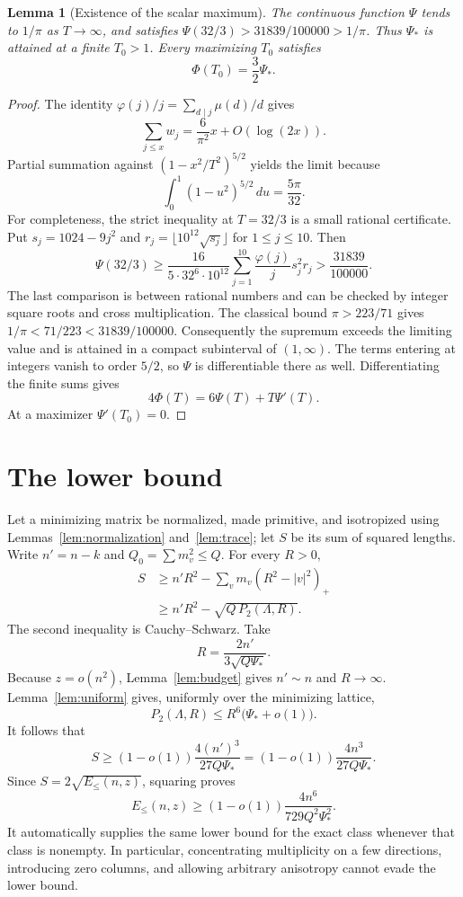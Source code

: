 \documentclass[11pt]{article}
\newtheorem{lemma}[theorem]{Lemma}
\theoremstyle{remark}\newtheorem{remark}[theorem]{Remark}
\begin{document}
\begin{lemma}[Existence of the scalar maximum]\label{lem:maximum}
The continuous function $\Psi$ tends to $1/\pi$ as $T\to\infty$, and satisfies $\Psi(32/3)>31839/100000>1/\pi$. Thus $\Psi_*$ is attained at a finite $T_0>1$. Every maximizing $T_0$ satisfies
\[
 \Phi(T_0)=\frac32\Psi_*.
\]
\end{lemma}
\begin{proof}
The identity $\varphi(j)/j=\sum_{d\mid j}\mu(d)/d$ gives
\[
 \sum_{j\le x}w_j=\frac6{\pi^2}x+O(\log(2x)).
\]
Partial summation against $(1-x^2/T^2)^{5/2}$ yields the limit because
\[
 \int_0^1(1-u^2)^{5/2}\,du=\frac{5\pi}{32}.
\]
For completeness, the strict inequality at $T=32/3$ is a small rational certificate. Put $s_j=1024-9j^2$ and $r_j=\lfloor10^{12}\sqrt{s_j}\rfloor$ for $1\le j\le10$. Then
\[
 \Psi(32/3)\ge\frac{16}{5\cdot32^6\cdot10^{12}}
 \sum_{j=1}^{10}\frac{\varphi(j)}{j}s_j^2r_j>\frac{31839}{100000}.
\]
The last comparison is between rational numbers and can be checked by integer square roots and cross multiplication. The classical bound $\pi>223/71$ gives $1/\pi<71/223<31839/100000$. Consequently the supremum exceeds the limiting value and is attained in a compact subinterval of $(1,\infty)$. The terms entering at integers vanish to order $5/2$, so $\Psi$ is differentiable there as well. Differentiating the finite sums gives
\[
 4\Phi(T)=6\Psi(T)+T\Psi'(T).
\]
At a maximizer $\Psi'(T_0)=0$.
\end{proof}

\section{The lower bound}
Let a minimizing matrix be normalized, made primitive, and isotropized using Lemmas~\ref{lem:normalization} and~\ref{lem:trace}; let $S$ be its sum of squared lengths. Write $n'=n-k$ and $Q_0=\sum m_v^2\le Q$. For every $R>0$,
\begin{align*}
 S&\ge n'R^2-\sum_v m_v(R^2-|v|^2)_+\\
  &\ge n'R^2-\sqrt{Q\,P_2(\Lambda,R)}.
\end{align*}
The second inequality is Cauchy--Schwarz. Take
\[
 R=\frac{2n'}{3\sqrt{Q\Psi_*}}.
\]
Because $z=o(n^2)$, Lemma~\ref{lem:budget} gives $n'\sim n$ and $R\to\infty$. Lemma~\ref{lem:uniform} gives, uniformly over the minimizing lattice,
\[
 P_2(\Lambda,R)\le R^6\bigl(\Psi_*+o(1)\bigr).
\]
It follows that
\[
 S\ge\left(1-o(1)\right)\frac{4(n')^3}{27Q\Psi_*}
   =\left(1-o(1)\right)\frac{4n^3}{27Q\Psi_*}.
\]
Since $S=2\sqrt{E_{\le}(n,z)}$, squaring proves
\[
 E_{\le}(n,z)\ge(1-o(1))\frac{4n^6}{729Q^2\Psi_*^2}.
\]
It automatically supplies the same lower bound for the exact class whenever that class is nonempty. In particular, concentrating multiplicity on a few directions, introducing zero columns, and allowing arbitrary anisotropy cannot evade the lower bound.
\end{document}
